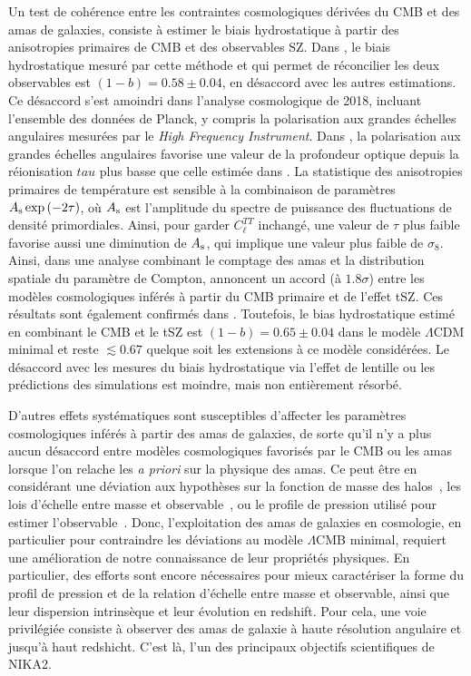 Un test de cohérence entre les contraintes cosmologiques dérivées du
CMB et des amas de galaxies, consiste à estimer le biais hydrostatique
à partir des anisotropies primaires de CMB et des observables SZ. Dans
\citet{Planck_2016_SZ_cosmo}, le biais hydrostatique mesuré par cette
méthode et qui permet de réconcilier les deux observables est
$(1-b) = 0.58 \pm 0.04$, en désaccord avec les autres estimations. Ce
désaccord s'est amoindri dans l'analyse cosmologique de 2018, incluant
l'ensemble des données de Planck, y compris la polarisation aux
grandes échelles angulaires mesurées par le \emph{High Frequency
Instrument}. Dans \citet{Planck_2018_cosmo}, la polarisation aux
grandes échelles angulaires favorise une valeur de la profondeur
optique depuis la réionisation $tau$ plus basse que celle estimée
dans \citet{Planck_2016_cosmo}. La statistique des anisotropies
primaires de température est sensible à la combinaison de paramètres
$A_{\rm{s}} \exp{(-2\tau)}$, où $A_{\rm{s}}$ est l'amplitude du spectre
de puissance des fluctuations de densité primordiales. Ainsi, pour
garder $C_\ell^{TT}$ inchangé, une valeur de $\tau$ plus faible
favorise aussi une diminution de $A_{\rm{s}}$, qui implique une valeur
plus faible de $\sigma_8$. Ainsi, dans une analyse combinant le
comptage des amas et la distribution spatiale du paramètre de
Compton, \citet{Salvati2018} annoncent un accord (à $1.8\sigma$) entre
les modèles cosmologiques inférés à partir du CMB primaire et de
l'effet tSZ. Ces résultats sont également confirmés
dans \citet{Zulbedia2019}. Toutefois, le bias hydrostatique estimé en
combinant le CMB et le tSZ est $(1-b) = 0.65 \pm 0.04$ dans le modèle
$\Lambda$CDM minimal et reste $\lesssim 0.67$ quelque soit les
extensions à ce modèle considérées. Le désaccord avec les
mesures du biais hydrostatique via l'effet de lentille ou les
prédictions des simulations est moindre, mais non entièrement
résorbé. 

D'autres effets systématiques sont susceptibles d'affecter les
paramètres cosmologiques inférés à partir des amas de galaxies, de
sorte qu'il n'y a plus aucun désaccord entre modèles cosmologiques
favorisés par le CMB ou les amas lorsque l'on relache les \emph{a
priori} sur la physique des amas. Ce peut être en considérant une
déviation aux hypothèses sur la fonction de masse des
halos~\citep{Bocquet2016}, les lois d'échelle entre masse et
observable~\citep{Planck_2016_SZ_cosmo}, ou le profile de pression
utilisé pour estimer l'observable~\citep{Ruppin2019b}. Donc,
l'exploitation des amas de galaxies en cosmologie, en particulier pour
contraindre les déviations au modèle $\Lambda$CMB minimal, requiert
une amélioration de notre connaissance de leur propriétés
physiques. En particulier, des efforts sont encore nécessaires pour
mieux caractériser la forme du profil de pression et de la relation
d'échelle entre masse et observable, ainsi que leur dispersion
intrinsèque et leur évolution en redshift.  
Pour cela, une voie privilégiée consiste à observer des amas de
galaxie à haute résolution angulaire et jusqu'à haut redshicht. C'est
là, l'un des principaux objectifs scientifiques de NIKA2. 



